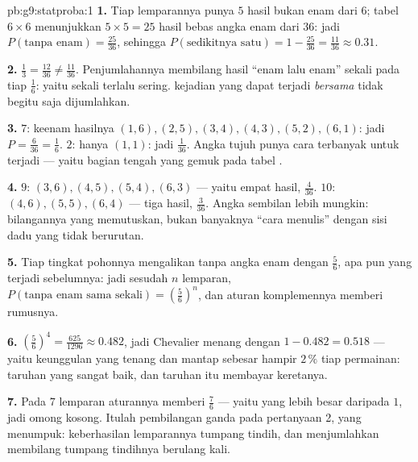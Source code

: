 \begin{solution}{pb:g9:statproba:1}
\textbf{1.} Tiap lemparannya punya $5$ hasil bukan enam dari $6$;
tabel $6 \times 6$ menunjukkan $5 \times 5 = 25$ hasil bebas angka
enam dari $36$: jadi $P(\text{tanpa enam}) = \frac{25}{36}$, sehingga
$P(\text{sedikitnya satu}) = 1 - \frac{25}{36} = \frac{11}{36}
\approx 0.31$.

\textbf{2.} $\frac13 = \frac{12}{36} \neq \frac{11}{36}$.
Penjumlahannya membilang hasil ``enam lalu enam'' sekali pada tiap
$\frac16$: yaitu sekali terlalu sering.  kejadian yang dapat
terjadi \emph{bersama} tidak begitu saja dijumlahkan.

\textbf{3.}  $7$: keenam hasilnya $(1,6), (2,5), (3,4),
(4,3), (5,2), (6,1)$: jadi $P = \frac{6}{36} = \frac16$.  $2$:
hanya $(1,1)$: jadi $\frac{1}{36}$. Angka tujuh punya cara terbanyak
untuk terjadi --- yaitu bagian tengah yang gemuk pada tabel .

\textbf{4.}  $9$: $(3,6), (4,5), (5,4), (6,3)$ --- yaitu empat
hasil, $\frac{4}{36}$.  $10$: $(4,6), (5,5), (6,4)$ ---
tiga hasil, $\frac{3}{36}$. Angka sembilan lebih mungkin: bilangannya
yang memutuskan, bukan banyaknya ``cara menulis''  dengan
sisi dadu yang tidak berurutan.

\textbf{5.} Tiap tingkat pohonnya mengalikan  tanpa angka enam
dengan $\frac56$, apa pun yang terjadi sebelumnya: jadi sesudah $n$
lemparan, $P(\text{tanpa enam sama sekali}) = \left(\frac56\right)^n$,
dan aturan komplemennya memberi rumusnya.

\textbf{6.} $\left(\frac56\right)^4 = \frac{625}{1296} \approx
0.482$, jadi Chevalier menang dengan 
$1 - 0.482 = 0.518$ --- yaitu keunggulan yang tenang dan mantap
sebesar hampir $2\,\%$ tiap permainan: taruhan yang sangat baik, dan
taruhan itu membayar keretanya.

\textbf{7.} Pada $7$ lemparan aturannya memberi $\frac76$ --- yaitu
 yang lebih besar daripada $1$, jadi omong kosong. Itulah
pembilangan ganda pada pertanyaan 2, yang menumpuk: keberhasilan
lemparannya tumpang tindih, dan menjumlahkan  membilang
tumpang tindihnya berulang kali.


\end{solution}
